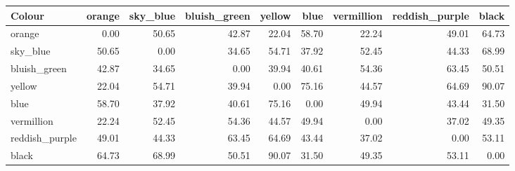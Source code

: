 \begin{tabular}{lrrrrrrrr}
\toprule
Colour & orange & sky\_blue & bluish\_green & yellow & blue & vermillion & reddish\_purple & black \\
\midrule
orange & 0.00 & 50.65 & 42.87 & 22.04 & 58.70 & 22.24 & 49.01 & 64.73 \\
sky\_blue & 50.65 & 0.00 & 34.65 & 54.71 & 37.92 & 52.45 & 44.33 & 68.99 \\
bluish\_green & 42.87 & 34.65 & 0.00 & 39.94 & 40.61 & 54.36 & 63.45 & 50.51 \\
yellow & 22.04 & 54.71 & 39.94 & 0.00 & 75.16 & 44.57 & 64.69 & 90.07 \\
blue & 58.70 & 37.92 & 40.61 & 75.16 & 0.00 & 49.94 & 43.44 & 31.50 \\
vermillion & 22.24 & 52.45 & 54.36 & 44.57 & 49.94 & 0.00 & 37.02 & 49.35 \\
reddish\_purple & 49.01 & 44.33 & 63.45 & 64.69 & 43.44 & 37.02 & 0.00 & 53.11 \\
black & 64.73 & 68.99 & 50.51 & 90.07 & 31.50 & 49.35 & 53.11 & 0.00 \\
\bottomrule
\end{tabular}
